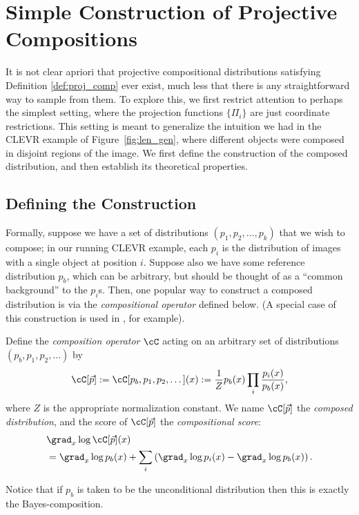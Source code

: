 \section{Simple Construction of Projective Compositions}
\label{sec:comp_coord}

It is not clear apriori that projective compositional distributions satisfying Definition \ref{def:proj_comp} ever exist, much less that there is any straightforward way to sample from them.
To explore this, we first restrict attention to perhaps the simplest setting, where the projection functions $\{\Pi_i\}$ are
just coordinate restrictions.
This setting is meant to generalize the intuition we had
in the CLEVR example of Figure~\ref{fig:len_gen},
where different objects were composed in disjoint regions of the image.
We first define the construction of the composed distribution,
and then establish its theoretical properties.








\subsection{Defining the Construction}
Formally, suppose we have a set of distributions
$(p_1, p_2, \ldots, p_k)$ that we wish to compose;
in our running CLEVR example, each $p_i$ is the distribution of images
with a single object at position $i$.
Suppose also we have some reference distribution $p_b$,
which can be arbitrary, but should be thought of as a 
``common background'' to the $p_i$s.
Then, one popular way to construct a composed distribution
is via the \emph{compositional operator} defined below.
(A special case of this construction is used in \citet{du2023reduce}, for example).


\begin{definition}
    \label{def:comp_oper}
    Define the \emph{composition operator} $\cC$ acting on an arbitrary set of distributions $(p_b, p_1, p_2, \ldots)$ by
    \begin{align}
    \label{eq:comp_oper}
    \cC[\vec{p}] := \cC[p_b, p_1, p_2, \dots](x) := \frac{1}{Z} p_b(x) \prod_i \frac{p_i(x)}{p_b(x)},
    \end{align}
    where $Z$ is the appropriate normalization constant. We name $\cC[\vec{p}]$ the \emph{composed distribution}, and the score of $\cC[\vec{p}]$ the \emph{compositional score}:
    \begin{align}
    \label{eqn:comp_score}
    &\grad_x \log \cC[\vec{p}](x)  \\
    &= \grad_x \log p_b(x) + \sum_i \left( \grad_x \log p_i(x) - \grad_x \log p_b(x) \right). \notag
    \end{align}
\end{definition}
Notice that if $p_b$ is taken to be the unconditional distribution then this is exactly the Bayes-composition.


